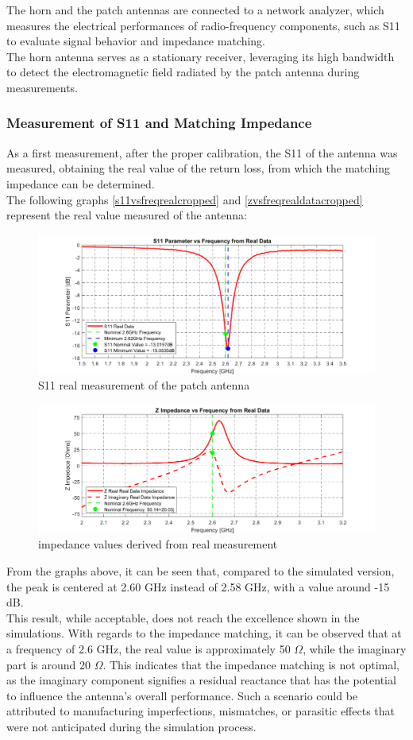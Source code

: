 \documentclass[]{article}
\begin{document}
The horn and the patch antennas are connected to a network analyzer, which measures the electrical performances of radio-frequency components, such as S11 to evaluate signal behavior and impedance matching.\\
The horn antenna serves as a stationary receiver, leveraging its high bandwidth to detect the electromagnetic field radiated by the patch antenna during measurements.\\
\subsubsection{Measurement of S11 and Matching Impedance}
As a first measurement, after the proper calibration, the S11 of the antenna was measured, obtaining the real value of the return loss, from which the matching impedance can be determined.\\
The following graphs \eqref{s11vsfreqrealcropped} and \eqref{zvsfreqrealdatacropped} represent the real value measured of the antenna: 
\begin{figure}[H]
	\centering
	\includegraphics[width=0.7\linewidth]{img/S11_vs_freq_real_cropped}
	\caption{S11 real measurement of the patch antenna}
	\label{s11vsfreqrealcropped}
\end{figure}

\begin{figure}[h]
	\centering
	\includegraphics[width=0.7\linewidth]{img/Z_vs_freq_real_data_cropped}
	\caption{impedance values derived from real measurement }
	\label{zvsfreqrealdatacropped}
\end{figure}

From the graphs above, it can be seen that, compared to the simulated version, the peak is centered at 2.60 GHz instead of 2.58 GHz, with a value around -15 dB.\\
This result, while acceptable, does not reach the excellence shown in the simulations. With regards to the impedance matching, it can be observed that at a frequency of 2.6 GHz, the real value is approximately 50 $\Omega$, while the imaginary part is around 20 $\Omega$. This indicates that the impedance matching is not optimal, as the imaginary component signifies a residual reactance that has the potential to influence the antenna's overall performance. Such a scenario could be attributed to manufacturing imperfections, mismatches, or parasitic effects that were not anticipated during the simulation process. 
\end{document}

